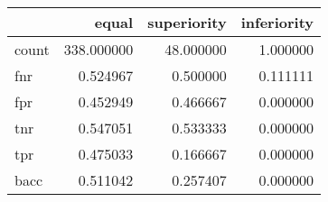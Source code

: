\begin{tabular}{lrrr}
\toprule
{} &       equal &  superiority &  inferiority \\
\midrule
count &  338.000000 &    48.000000 &     1.000000 \\
fnr   &    0.524967 &     0.500000 &     0.111111 \\
fpr   &    0.452949 &     0.466667 &     0.000000 \\
tnr   &    0.547051 &     0.533333 &     0.000000 \\
tpr   &    0.475033 &     0.166667 &     0.000000 \\
bacc  &    0.511042 &     0.257407 &     0.000000 \\
\bottomrule
\end{tabular}
